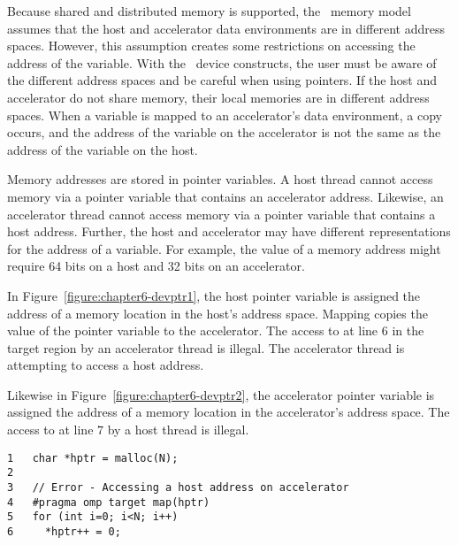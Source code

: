 Because shared and distributed memory is supported, the \OMP\ memory model
assumes that the host and accelerator data environments are in different
address spaces.  However, this assumption creates some restrictions on
accessing the address of the variable.
With the \OMP\ device constructs, the user must be aware of the different
address spaces and be careful when using pointers.  
If the host and accelerator do not share memory, their local memories are in
different address spaces.  When a variable is mapped to an accelerator's data
environment, a copy occurs, and the address of the variable on the accelerator
is not the same as the address of the variable on the host.

Memory addresses are stored in pointer variables.  A host thread cannot access
memory via a pointer variable that contains an accelerator address.  Likewise,
an accelerator thread cannot access memory via a pointer variable that contains
a host address.  
Further, the host and accelerator may have different representations for the
address of a variable.  For example, the value of a memory address might
require 64 bits on a host and 32 bits on an accelerator.

In Figure~\ref{figure:chapter6-devptr1}, the host pointer variable  is
assigned the address of a memory location in the host's address space.  
Mapping  copies the value of the pointer variable to the accelerator. The
access to  at line $6$ in the target region by an accelerator thread is illegal.
The accelerator thread is attempting to access a host address.

Likewise in Figure~\ref{figure:chapter6-devptr2}, the accelerator pointer
variable  is assigned the address of a memory location in the
accelerator's address space.  The access to  at line $7$ by a host thread is illegal.

\begin{figure*}[!tb]
\begin{verbatim}
1   char *hptr = malloc(N);
2
3   // Error - Accessing a host address on accelerator
4   #pragma omp target map(hptr)
5   for (int i=0; i<N; i++)
6     *hptr++ = 0;
\end{verbatim}
\caption{ \textbf {Illegal access of a host memory address } -- \small
          A pointer variable containing a host memory address cannot be
          de-referenced by an accelerator thread.
         }
\label{figure:chapter6-devptr1}
\end{figure*}

